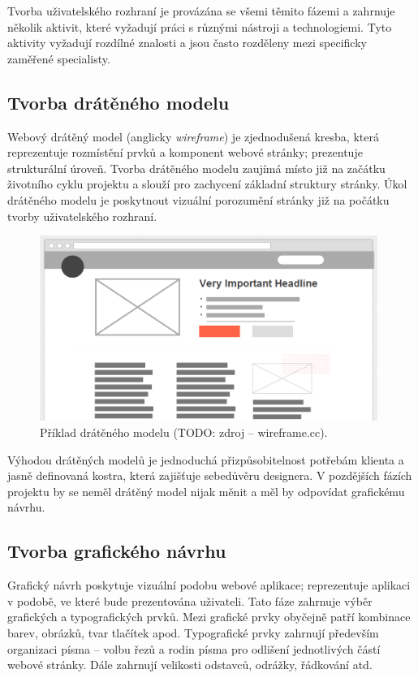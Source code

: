 Tvorba uživatelského rozhraní je provázána se všemi těmito fázemi a zahrnuje několik aktivit, které vyžadují práci s různými nástroji a technologiemi. Tyto aktivity vyžadují rozdílné znalosti a jsou často rozděleny mezi specificky zaměřené specialisty.

\subsection{Tvorba drátěného modelu}
\label{sec:wireframing}

Webový drátěný model (anglicky \textit{wireframe}) je zjednodušená kresba, která reprezentuje rozmístění prvků a komponent webové stránky; prezentuje strukturální úroveň. Tvorba drátěného modelu zaujímá místo již na začátku životního cyklu projektu a slouží pro zachycení základní struktury stránky. Úkol drátěného modelu je poskytnout vizuální porozumění stránky již na počátku tvorby uživatelského rozhraní.

\begin{figure}[htbp]
    \centering
    \includegraphics[width=11cm]{images/wireframe-example.png}
    \caption{Příklad drátěného modelu (TODO: zdroj -- wireframe.cc).}
\end{figure}

Výhodou drátěných modelů je jednoduchá přizpůsobitelnost potřebám klienta a jasně definovaná kostra, která zajišťuje sebedůvěru designera. V pozdějších fázích projektu by se neměl drátěný model nijak měnit a měl by odpovídat grafickému návrhu.

\subsection{Tvorba grafického návrhu}
\label{sec:designing}

Grafický návrh poskytuje vizuální podobu webové aplikace; reprezentuje aplikaci v podobě, ve které bude prezentována uživateli. Tato fáze zahrnuje výběr grafických a typografických prvků. Mezi grafické prvky obyčejně patří kombinace barev, obrázků, tvar tlačítek apod. Typografické prvky zahrnují především organizaci písma -- volbu řezů a rodin písma pro odlišení jednotlivých částí webové stránky. Dále zahrnují velikosti odstavců, odrážky, řádkování atd.

